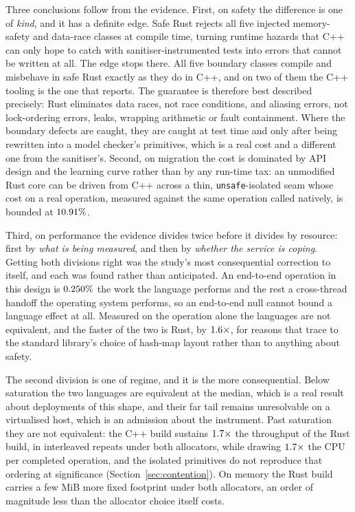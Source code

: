 \documentclass[english,twoside,openright,a4paper,censored,csm,software-track-2020]{HYthesisML}
\begin{document}
Three conclusions follow from the evidence. First, on safety the difference is one of
\emph{kind}, and it has a definite edge. Safe Rust rejects all five injected memory-safety and
data-race classes at compile time, turning runtime hazards that C++ can only hope to catch with
sanitiser-instrumented tests into errors that cannot be written at all. The edge stops there.
All five boundary
classes compile and misbehave in safe Rust exactly as they do in C++, and on two of them the C++
tooling is the one that reports. The guarantee is therefore best described precisely: Rust
eliminates data races, not race conditions, and aliasing errors, not lock-ordering errors,
leaks, wrapping arithmetic or fault containment. Where the boundary defects are caught, they are
caught at test time and only after being rewritten into a model checker's primitives, which is a
real cost and a different one from the sanitiser's. Second, on migration
the cost is dominated by API design and the learning curve rather than by any run-time tax: an
unmodified Rust core can be driven from C++ across a thin, \texttt{unsafe}-isolated seam whose
cost on a real operation, measured against the same operation called natively, is bounded at
$10.91\%$.

Third, on performance the evidence divides twice before it divides by resource: first by
\emph{what is being measured}, and then by \emph{whether the service is coping}. Getting both
divisions right was the study's most consequential correction to itself, and each was found rather
than anticipated. An end-to-end operation in this design is $0.250\%$ the work the
language performs and the rest a cross-thread handoff the operating system performs, so an
end-to-end null cannot bound a language effect at all. Measured on the operation alone the
languages are not equivalent, and the faster of the two is Rust, by $1.6\times$, for
reasons that trace to the standard library's choice of hash-map layout rather than to anything
about safety.

The second division is one of regime, and it is the more consequential. Below saturation the two
languages are equivalent at the median, which is a real result about deployments of this shape,
and their far tail remains unresolvable on a virtualised host, which is an admission about the
instrument. Past saturation they are not equivalent: the C++ build sustains
$1.7\times$ the throughput of the Rust build, in \OverloadThrAgree{} interleaved
repeats under both allocators, while drawing $1.7\times$ the CPU per completed
operation, and the isolated primitives do not reproduce that ordering at significance
(Section~\ref{sec:contention}). On memory the Rust build carries a few MiB more fixed footprint
under both allocators, an order of magnitude less than the allocator choice itself costs.
\end{document}
